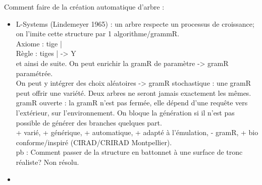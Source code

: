 \documentclass[11pt]{article}
\begin{document}
{Comment faire de la création automatique d'arbre :
\begin{itemize}
	\item L-Systems (Lindemeyer 1965) : un arbre respecte un processus de croissance; on l'imite cette structure par 1 algorithme/grammR.\\
		Axiome : tige |\\
		Règle : tiges | -> Y\\ 
		et ainsi de suite. On peut enrichir la gramR de paramètre -> gramR paramétrée.\\
		On peut y intégrer des choix aléatoires -> gramR stochastique : une gramR peut offrir une variété. Deux arbres ne seront jamais exactement les mêmes.\\
		gramR ouverte : la gramR n'est pas fermée, elle dépend d'une requête vers l'extérieur, sur l'environnement. On bloque la génération si il n'est pas possible de générer des branches quelques part.\\
		+ varié, + générique, + automatique, + adapté à l'émulation, - gramR, + bio conforme/inspiré (CIRAD/CRIRAD Montpellier).\\
		pb : Comment passer de la structure en battonnet à une surface de tronc réaliste? Non résolu.
	\item 
\end{itemize}

}
\end{document}
